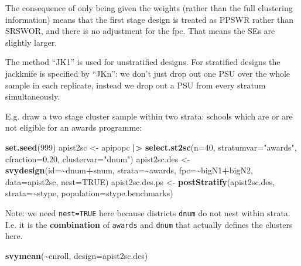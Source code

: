\documentclass[
]{book}
\newenvironment{Shaded}{\begin{snugshade}}{\end{snugshade}}
\newcommand{\AttributeTok}[1]{\textcolor[rgb]{0.13,0.29,0.53}{#1}}
\newcommand{\ConstantTok}[1]{\textcolor[rgb]{0.56,0.35,0.01}{#1}}
\newcommand{\DecValTok}[1]{\textcolor[rgb]{0.00,0.00,0.81}{#1}}
\newcommand{\FloatTok}[1]{\textcolor[rgb]{0.00,0.00,0.81}{#1}}
\newcommand{\FunctionTok}[1]{\textcolor[rgb]{0.13,0.29,0.53}{\textbf{#1}}}
\newcommand{\NormalTok}[1]{#1}
\newcommand{\OtherTok}[1]{\textcolor[rgb]{0.56,0.35,0.01}{#1}}
\newcommand{\SpecialCharTok}[1]{\textcolor[rgb]{0.81,0.36,0.00}{\textbf{#1}}}
\newcommand{\StringTok}[1]{\textcolor[rgb]{0.31,0.60,0.02}{#1}}
\begin{document}
The consequence of only being given the weights (rather than the full clustering
information) means that the first stage design is treated as PPSWR rather than SRSWOR,
and there is no adjustment for the fpc. That means the SEs are slightly larger.

The method ``JK1'' is used for unstratified designs. For stratified
designs the jackknife is specified by ``JKn'': we don't just drop out one PSU over
the whole sample in each replicate, instead we drop out a PSU from every stratum
simultaneously.

E.g. draw a two stage cluster sample within two strata: schools which are or are
not eligible for an awards programme:

\begin{Shaded}
\begin{Highlighting}[]
\FunctionTok{set.seed}\NormalTok{(}\DecValTok{999}\NormalTok{)}
\NormalTok{apist2sc }\OtherTok{\textless{}{-}}\NormalTok{ apipopc }\SpecialCharTok{|\textgreater{}}
  \FunctionTok{select.st2sc}\NormalTok{(}\AttributeTok{n=}\DecValTok{40}\NormalTok{, }\AttributeTok{stratumvar=}\StringTok{"awards"}\NormalTok{, }\AttributeTok{cfraction=}\FloatTok{0.20}\NormalTok{, }\AttributeTok{clustervar=}\StringTok{"dnum"}\NormalTok{)}
\NormalTok{apist2sc.des }\OtherTok{\textless{}{-}} \FunctionTok{svydesign}\NormalTok{(}\AttributeTok{id=}\SpecialCharTok{\textasciitilde{}}\NormalTok{dnum}\SpecialCharTok{+}\NormalTok{snum, }\AttributeTok{strata=}\SpecialCharTok{\textasciitilde{}}\NormalTok{awards, }\AttributeTok{fpc=}\SpecialCharTok{\textasciitilde{}}\NormalTok{bigN1}\SpecialCharTok{+}\NormalTok{bigN2, }
                          \AttributeTok{data=}\NormalTok{apist2sc, }\AttributeTok{nest=}\ConstantTok{TRUE}\NormalTok{)}
\NormalTok{apist2sc.des.ps }\OtherTok{\textless{}{-}} \FunctionTok{postStratify}\NormalTok{(apist2sc.des, }\AttributeTok{strata=}\SpecialCharTok{\textasciitilde{}}\NormalTok{stype, }\AttributeTok{population=}\NormalTok{stype.benchmarks)}
\end{Highlighting}
\end{Shaded}

Note: we need \texttt{nest=TRUE} here because districts \texttt{dnum} do not nest within strata.
I.e. it is the \textbf{combination} of \texttt{awards} and \texttt{dnum} that actually defines the clusters here.

\begin{Shaded}
\begin{Highlighting}[]
\FunctionTok{svymean}\NormalTok{(}\SpecialCharTok{\textasciitilde{}}\NormalTok{enroll, }\AttributeTok{design=}\NormalTok{apist2sc.des)}
\end{Highlighting}
\end{Shaded}
\end{document}
